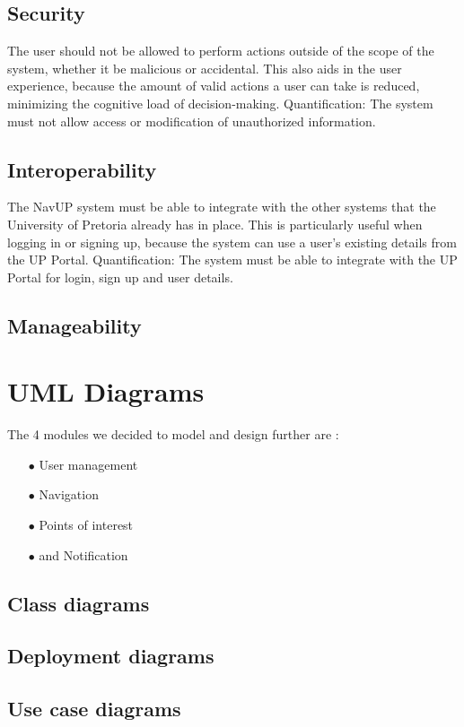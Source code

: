 \documentclass[english]{article}
\begin{document}
	\subsection{Security}
	The user should not be allowed to perform actions outside of the scope of the system, whether it be malicious or accidental. This also aids in the user experience, because the amount of valid actions a user can take is reduced, minimizing the cognitive load of decision-making.
	\newline
	\newline
	{Quantification:} The system must not allow access or modification of unauthorized information.
	\subsection{Interoperability}
	The NavUP system must be able to integrate with the other systems that the University of Pretoria already has in place. This is particularly useful when logging in or signing up, because the system can use a user's existing details from the UP Portal.
	\newline
	\newline
	{Quantification:} The system must be able to integrate with the UP Portal for login, sign up and user details.
	
	\subsection{Manageability}
		
	\section{UML Diagrams}
	The 4 modules we decided to model and design further are :
	\begin{itemize}
		\item[$\bullet$] User management
		\item[$\bullet$] Navigation
		\item[$\bullet$] Points of interest
		\item[$\bullet$] and Notification
	\end{itemize}
		\subsection{Class diagrams}
		\subsection{Deployment diagrams}
		\subsection{Use case diagrams}	
	
		
		
		
			
	
		
\end{document}
